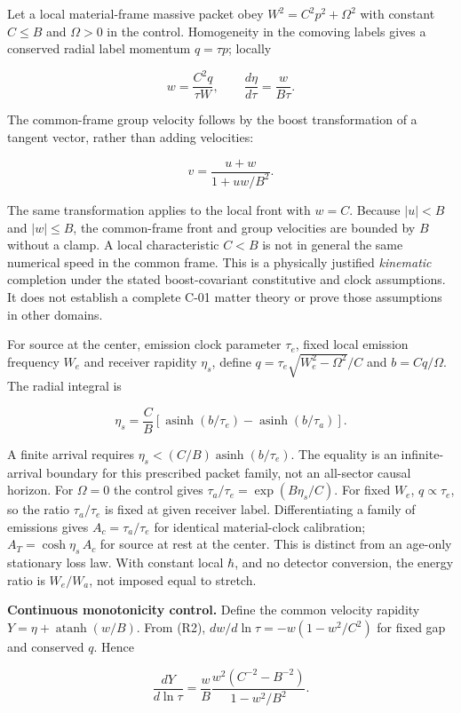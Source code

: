 \documentclass[
  11pt,
  twoside]{article}
\begin{document}
Let a local material-frame massive packet obey \(W^2=C^2p^2+\Omega^2\)
with constant \(C\leq B\) and \(\Omega>0\) in the control. Homogeneity
in the comoving labels gives a conserved radial label momentum
\(q=\tau p\); locally

\[w=\frac{C^2q}{\tau W},\qquad \frac{d\eta}{d\tau}=\frac{w}{B\tau}.\tag{R2}\]

The common-frame group velocity follows by the boost transformation of a
tangent vector, rather than adding velocities:

\[v=\frac{u+w}{1+uw/B^2}.\tag{R3}\]

The same transformation applies to the local front with \(w=C\). Because
\(|u|<B\) and \(|w|\leq B\), the common-frame front and group velocities
are bounded by \(B\) without a clamp. A local characteristic \(C<B\) is
not in general the same numerical speed in the common frame. This is a
physically justified \emph{kinematic} completion under the stated
boost-covariant constitutive and clock assumptions. It does not
establish a complete C-01 matter theory or prove those assumptions in
other domains.

For source at the center, emission clock parameter \(\tau_e\), fixed
local emission frequency \(W_e\) and receiver rapidity \(\eta_s\),
define \(q=\tau_e\sqrt{W_e^2-\Omega^2}/C\) and \(b=Cq/\Omega\). The
radial integral is

\[\eta_s=\frac CB\left[\operatorname{asinh}(b/\tau_e)
-\operatorname{asinh}(b/\tau_a)\right].\tag{R4}\]

A finite arrival requires
\(\eta_s<(C/B)\operatorname{asinh}(b/\tau_e)\). The equality is an
infinite-arrival boundary for this prescribed packet family, not an
all-sector causal horizon. For \(\Omega=0\) the control gives
\(\tau_a/\tau_e=\exp(B\eta_s/C)\). For fixed \(W_e\),
\(q\propto\tau_e\), so the ratio \(\tau_a/\tau_e\) is fixed at given
receiver label. Differentiating a family of emissions gives
\(A_c=\tau_a/\tau_e\) for identical material-clock calibration;
\(A_T=\cosh\eta_s\,A_c\) for source at rest at the center. This is
distinct from an age-only stationary loss law. With constant local
\(\hbar\), and no detector conversion, the energy ratio is \(W_e/W_a\),
not imposed equal to stretch.

\textbf{Continuous monotonicity control.} Define the common velocity
rapidity \(Y=\eta+\operatorname{atanh}(w/B)\). From (R2),
\(dw/d\ln\tau=-w(1-w^2/C^2)\) for fixed gap and conserved \(q\). Hence

\[\frac{dY}{d\ln\tau}=\frac{w}{B}\frac{w^2(C^{-2}-B^{-2})}{1-w^2/B^2}.\tag{R5}\]
\end{document}
